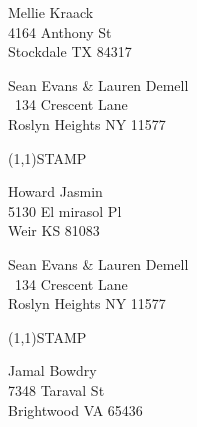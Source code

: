 \documentclass[12pt]{article}
\begin{document}
\begin{center} \begin{Huge} \vspace*{\fill}
Mellie Kraack\\
4164 Anthony St\\
Stockdale TX 84317\\
\vspace{\fill} \end{Huge} \end{center}

\clearpage

\begin{minipage}{.5\linewidth} \noindent
Sean Evans \& Lauren Demell\\\ 
134 Crescent Lane\\ 
Roslyn Heights NY 11577
\end{minipage}
\begin{minipage}{.5\linewidth \hspace{-.2in} \vspace{-.3in}}
\begin{flushright}
\framebox(1,1){STAMP}
\end{flushright}
\end{minipage}

\begin{center} \begin{Huge} \vspace*{\fill}
Howard Jasmin\\
5130 El mirasol Pl\\
Weir KS 81083\\
\vspace{\fill} \end{Huge} \end{center}

\clearpage

\begin{minipage}{.5\linewidth} \noindent
Sean Evans \& Lauren Demell\\\ 
134 Crescent Lane\\ 
Roslyn Heights NY 11577
\end{minipage}
\begin{minipage}{.5\linewidth \hspace{-.2in} \vspace{-.3in}}
\begin{flushright}
\framebox(1,1){STAMP}
\end{flushright}
\end{minipage}

\begin{center} \begin{Huge} \vspace*{\fill}
Jamal Bowdry\\
7348 Taraval St\\
Brightwood VA 65436\\
\vspace{\fill} \end{Huge} \end{center}
\end{document}
